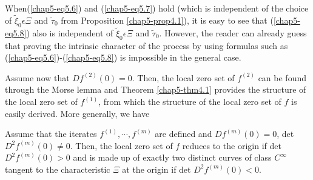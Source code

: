 When\pageoriginale (\ref{chap5-eq5.6}) and (\ref{chap5-eq5.7}) hold (which is independent of the choice of $\widetilde{\xi}_{0} \epsilon \Xi$ and $\widetilde{\tau}_{0}$ from Proposition \ref{chap5-prop4.1}), it is easy to see that (\ref{chap5-eq5.8}) also is independent of $\widetilde{\xi}_{0} \epsilon \Xi$ and $\widetilde{\tau}_{0}$. However, the reader can already guess that proving the intrinsic character of the process by using formulas such as (\ref{chap5-eq5.6})-(\ref{chap5-eq5.8}) is impossible in the general case.

Assume now that $Df^{(2)}(0) = 0$. Then, the local zero set of $f^{(2)}$ can be found through the Morse lemma and Theorem \ref{chap5-thm4.1} provides the structure of the local zero set of $f^{(1)}$, from which the structure of the local zero set of $f$ is easily derived. More generally, we have

\begin{theorem}\label{chap5-thm5.2}
Assume that the iterates $f^{(1)}, \cdots, f^{(m)}$ are defined and $Df^{(m)}(0) = 0$, det $D^{2}f^{(m)} (0) \neq 0$. Then, the local zero set of $f$ reduces to the origin if det $D^{2}f^{(m)}(0) > 0$ and is made up of exactly two distinct curves of class $C^{\infty}$ tangent to the characteristic $\Xi$ at the origin if det $D^{2}f^{(m)}(0) < 0$.
\end{theorem}

